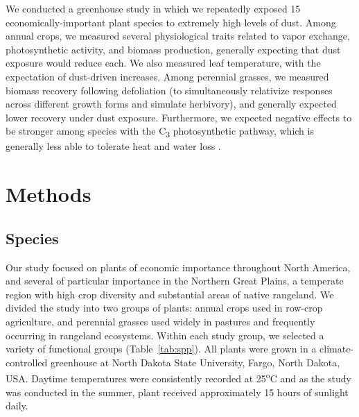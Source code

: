 \documentclass{svjour3}
\begin{document}
We conducted a greenhouse study in which we repeatedly exposed 15 economically-important plant species to extremely high levels of dust. 
Among annual crops, we measured several physiological traits related to vapor exchange, photosynthetic activity, and biomass production, generally expecting that dust exposure would reduce each. 
We also measured leaf temperature, with the expectation of dust-driven increases.
Among perennial grasses, we measured biomass recovery following defoliation (to simultaneously relativize responses across different growth forms and simulate herbivory), and generally expected lower recovery under dust exposure. 
Furthermore, we expected negative effects to be stronger among species with the C\textsubscript{3} photosynthetic pathway, which is generally less able to tolerate heat and water loss \citep[e.g.,][]{killi2017}. 

\section{Methods}

\subsection{Species}

Our study focused on plants of economic importance throughout North America, and several of particular  importance in the Northern Great Plains, a temperate region with high crop diversity and substantial areas of native rangeland. 
We divided the study into two groups of plants: annual crops used in row-crop agriculture, and perennial grasses used widely in pastures and frequently occurring in rangeland ecosystems. 
Within each study group, we selected a variety of functional groups (Table~\ref{tab:spp}). 
All plants were grown in a climate-controlled greenhouse at North Dakota State University, Fargo, North Dakota, USA. 
Daytime temperatures were consistently recorded at 25\textsuperscript{o}C and as the study was conducted in the summer, plant received approximately 15 hours of sunlight daily.
\end{document}
